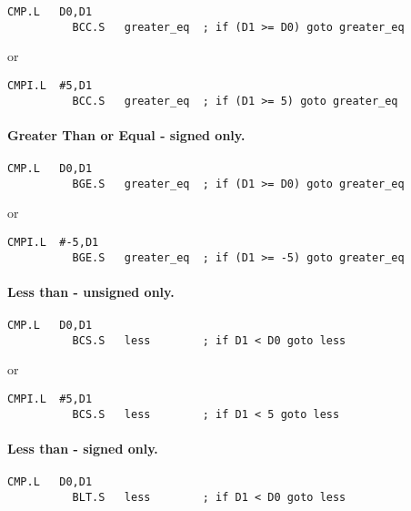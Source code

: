 \begin{lstlisting}[firstnumber=1,]
          CMP.L   D0,D1
          BCC.S   greater_eq  ; if (D1 >= D0) goto greater_eq
\end{lstlisting}

or

\begin{lstlisting}[firstnumber=1,]
          CMPI.L  #5,D1
          BCC.S   greater_eq  ; if (D1 >= 5) goto greater_eq
\end{lstlisting}

\paragraph{Greater Than or Equal -{} signed only.}

\begin{lstlisting}[firstnumber=1,]
          CMP.L   D0,D1
          BGE.S   greater_eq  ; if (D1 >= D0) goto greater_eq
\end{lstlisting}

or

\begin{lstlisting}[firstnumber=1,]
          CMPI.L  #-5,D1
          BGE.S   greater_eq  ; if (D1 >= -5) goto greater_eq
\end{lstlisting}

\paragraph{Less than -{} unsigned only.}

\begin{lstlisting}[firstnumber=1,]
          CMP.L   D0,D1
          BCS.S   less        ; if D1 < D0 goto less
\end{lstlisting}

or

\begin{lstlisting}[firstnumber=1,]
          CMPI.L  #5,D1
          BCS.S   less        ; if D1 < 5 goto less
\end{lstlisting}

\paragraph{Less than -{} signed only.}

\begin{lstlisting}[firstnumber=1,]
          CMP.L   D0,D1
          BLT.S   less        ; if D1 < D0 goto less
\end{lstlisting}

